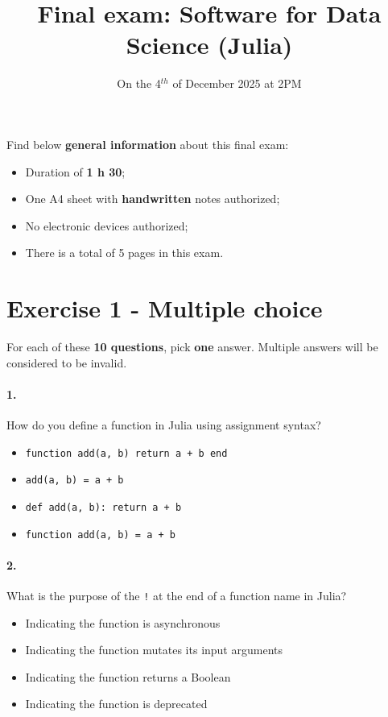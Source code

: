 \documentclass{article}
\title{Final exam: Software for Data Science (Julia)}
\author{On the 4$^{th}$ of December 2025 at 2PM}
\date{}
\begin{document}
\maketitle

Find below \textbf{general information} about this final exam:
\begin{itemize}
    \item Duration of \textbf{1 h 30};
    \item One A4 sheet with \textbf{handwritten} notes authorized;
    \item No electronic devices authorized;
    \item There is a total of 5 pages in this exam.
\end{itemize}

\section*{Exercise 1 - Multiple choice}

For each of these \textbf{10 questions}, pick \textbf{one} answer. Multiple answers will be considered to be invalid.

\paragraph{1.} How do you define a function in Julia using assignment syntax?
\begin{itemize}
    \item[A)] \texttt{function add(a, b) return a + b end}
    \item[B)] \texttt{add(a, b) = a + b}
    \item[C)] \texttt{def add(a, b): return a + b}
    \item[D)] \texttt{function add(a, b) = a + b}
\end{itemize}

\medskip
\noindent
\paragraph{2.} What is the purpose of the \texttt{!} at the end of a function name in Julia?
\begin{itemize}
    \item[A)] Indicating the function is asynchronous
    \item[B)] Indicating the function mutates its input arguments
    \item[C)] Indicating the function returns a Boolean
    \item[D)] Indicating the function is deprecated
\end{itemize}
\end{document}
